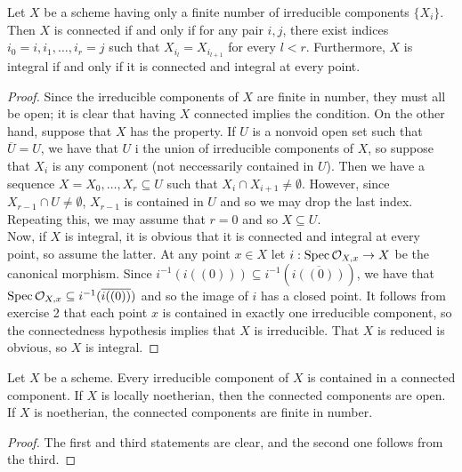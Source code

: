 \begin{exer}
	Let $X$ be a scheme having only a finite number of irreducible
	components $\{X_i\}$. Then $X$ is connected if and only if for any pair
	$i,j$, there exist indices $i_0 = i, i_1,\ldots,i_r = j$ such that
	$X_{i_l} = X_{i_{l+1}}$ for every $l < r$. Furthermore, $X$ is integral
	if and only if it is connected and integral at every point.
\end{exer}
\begin{proof}
	Since the irreducible components of $X$ are finite in number, they must
	all be open; it is clear that having $X$ connected implies the
	condition. On the other hand, suppose that $X$ has the property. If $U$
	is a nonvoid open set such that $\overline{U} = U$, we have that $U$ i
	the union of irreducible components of $X$, so suppose that $X_i$ is any
	component (not neccessarily contained in $U$). Then we have a sequence
	$X = X_0, \ldots, X_r \subseteq U$ such that $X_i \cap X_{i+1} \neq
	\emptyset$. However, since $X_{r-1} \cap U \neq \emptyset$, $X_{r-1}$ is
	contained in $U$ and so we may drop the last index. Repeating this, we
	may assume that $r = 0$ and so $X \subseteq U$.\\

	Now, if $X$ is integral, it is obvious that it is connected and integral
	at every point, so assume the latter. At any point $x \in X$ let 
	$i: \operatorname{Spec} \mathcal{O}_{X,x} \to X$ be the canonical morphism. Since
	$i^{-1}(i((0))) \subseteq i^{-1}(\overline{i((0))})$, we have that
	$\operatorname{Spec} \mathcal{O}_{X,x} \subseteq i^{-1}(\overline{i((0))})$ and so the image
	of $i$ has a closed point. It follows from exercise 2 that each point
	$x$ is contained in exactly one irreducible component, so the
	connectedness hypothesis implies that $X$ is irreducible. That $X$ is
	reduced is obvious, so $X$ is integral.
\end{proof}

\begin{exer}
	Let $X$ be a scheme. Every irreducible component of $X$ is contained in
	a connected component. If $X$ is locally noetherian, then the connected
	components are open. If $X$ is noetherian, the connected components are
	finite in number.
\end{exer}
\begin{proof}
	The first and third statements are clear, and the second one follows
	from the third.
\end{proof}

